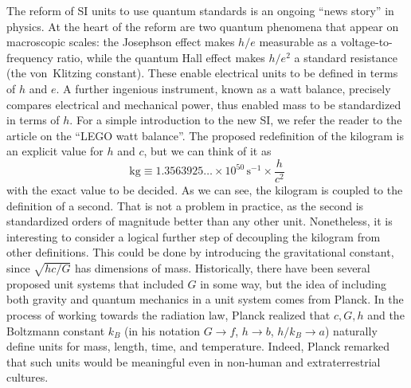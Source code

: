 \documentclass[prb,preprint]{revtex4-1}
\begin{document}
The reform of SI units to use quantum standards is an ongoing ``news
story'' in physics.\cite{BIPM16}  At the heart of the reform are two quantum
phenomena that appear on macroscopic scales: the Josephson effect
makes $h/e$ measurable as a voltage-to-frequency ratio, while the
quantum Hall effect makes $h/e^2$ a standard resistance (the
von~Klitzing constant).  These enable electrical units to be defined
in terms of $h$ and $e$.  A further ingenious instrument, known as a
watt balance, precisely compares electrical and mechanical power, thus
enabled mass to be standardized in terms of $h$.  For a simple
introduction to the new SI, we refer the reader to the article on the
``LEGO watt balance''.\cite{Chao15}
The proposed redefinition of the kilogram is an explicit value for
$h$ and $c$, but we can think of it as
\begin{equation}
\mathrm{kg} \equiv 1.3563925\ldots \times 10^{50} \, \mathrm{s}^{-1}
                   \times \frac{h}{c^2}
\end{equation}
with the exact value to be decided.  As we can see, the kilogram is
coupled to the definition of a second.  That is not a problem in
practice, as the second is standardized orders of magnitude better
than any other unit.  Nonetheless, it is interesting to consider a
logical further step of decoupling the kilogram from other
definitions.  This could be done by introducing the gravitational
constant, since $\sqrt{hc/G}$ has dimensions of mass.
Historically, there have been several proposed unit systems that
included $G$ in some way,\cite{Tomilin1999} but the idea of including
both gravity and quantum mechanics in a unit system comes from
Planck.\cite{Planck99} In the process of working towards the radiation
law, Planck realized that $c,G,h$ and the Boltzmann constant $k_B$ (in
his notation $G\rightarrow f$, $h\rightarrow b$, $h/k_B\rightarrow a$)
naturally define units for mass, length, time, and temperature.
Indeed, Planck remarked that such units would be meaningful even in
non-human and extraterrestrial cultures.
\end{document}
